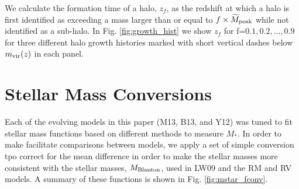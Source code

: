 \documentclass[a4paper,fleqn,usenatbib]{mnras}
\begin{document}
We calculate the formation time of a halo, $z_{f}$, as the redshift at which a halo is first identified as exceeding a mass larger than or equal to $f \times \widetilde{M}_{\rm peak}$ while not identified as a sub-halo.  In Fig. \ref{fig:growth_hist} we show $z_f$ for f=$0.1,0.2,...,0.9$ for three different halo growth histories marked with short vertical dashes below $m_{\rm vir}(z)$ in each panel.   



\section{Stellar Mass Conversions}
\label{appendix:stellar_mass_conv}

Each of the evolving models in this paper (M13, B13, and Y12) was tuned to fit stellar mass functions based on different methods to measure $M_*$.  In order to make facilitate comparisons between models, we apply a set of simple conversion tpo correct for the mean difference in order to make the stellar masses more consistent with the \citet{Blanton:2007cv} stellar masses, $M_{\rm Blanton}$, used in LW09 and the RM and RV models.  A summary of these functions is shown in Fig. \ref{fig:mstar_fconv}.
\end{document}
